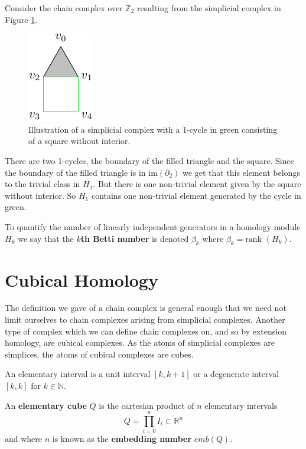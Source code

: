 \begin{example}
Consider the chain complex over $\mathbb{Z}_{2}$ resulting from the simplicial complex in Figure \ref{trihom}.
\begin{figure}[ht]
  \centering
  \includegraphics[scale=2]{trisquarefilled.pdf}
  \caption{\label{trihom} Illustration of a simplicial complex with a 1-cycle in green consisting of a square without interior.}
\end{figure}
There are two 1-cycles, the boundary of the filled triangle and the square. Since the boundary of the filled triangle is in $\text{im} (\partial_{2})$ we get that this element belongs to the trivial class in $H_{1}$. But there is one non-trivial element given by the square without interior. So $H_{1}$ contains one non-trivial element generated by the cycle in green.

To quantify the number of linearly independent generators in a homology module $H_{k}$ we say that the \textbf{$k$th Betti number} is denoted $\beta_{k}$ where $\beta_{k} = \text{rank }(H_{k})$.

\section{Cubical Homology}
The definition we gave of a chain complex is general enough that we need not limit ourselves to chain complexes arising from simplicial complexes. Another type of complex which we can define chain complexes on, and so by extension homology, are cubical complexes. As the atoms of simplicial complexes are simplices, the atoms of cubical complexes are cubes.

\begin{definition}
An elementary interval is a unit interval $[k,k+1]$ or a degenerate interval $[k,k]$ for $k \in \mathbb{N}$.
\end{definition}

\begin{definition}
  An \textbf{elementary cube} $Q$ is the cartesian product of $n$ elementary intervals
  \[Q = \prod^{n}_{i=0} I_{i} \subset \mathbb{R}^{n}\]
  and where $n$ is known as the \textbf{embedding number} $emb(Q)$.
\end{definition}


\end{example}
